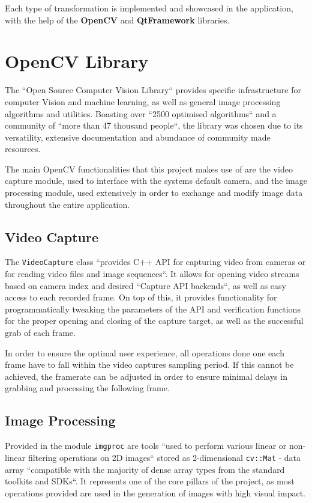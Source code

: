 Each type of transformation is implemented and showcased in the application, with the help of the
\textbf{OpenCV} and \textbf{QtFramework} libraries.

\section{OpenCV Library}

The ``Open Source Computer Vision Library`` provides specific infrastructure for computer Vision and
machine learning, as well as general image processing algorithms and utilities. Boasting over ``2500
optimised algorithms`` and a community of ``more than 47 thousand people``, the library was chosen
due to its versatility, extensive documentation and abundance of community made resources. \cite{opencvAbout}

The main OpenCV functionalities that this project makes use of are the video capture module, used
to interface with the systems default camera, and the image processing module, used extensively in
order to exchange and modify image data throughout the entire application.

\subsection{Video Capture}

The \verb|VideoCapture| class ``provides C++ API for capturing video from cameras or for reading video
files and image sequences``. It allows for opening video streams based on camera index and desired
``Capture API backends``, as well as easy access to each recorded frame. On top of this, it provides
functionality for programmatically tweaking the parameters of the API and verification functions
for the proper opening and closing of the capture target, as well as the successful grab of each frame.
\cite{opencvVideoCapture}

In order to ensure the optimal user experience, all operations done one each frame have to fall within
the video captures sampling period. If this cannot be achieved, the framerate can be adjusted in order
to ensure minimal delays in grabbing and processing the following frame.

\subsection{Image Processing}

Provided in the module \verb|imgproc| are tools ``used to perform various linear or non-linear filtering
operations on 2D images`` stored as 2-dimensional \verb|cv::Mat| - data array ``compatible with the
majority of dense array types from the standard toolkits and SDKs``.  It represents one of the core
pillars of the project, as most operations provided are used in the generation of images with high
visual impact. \cite{opencvImproc}

